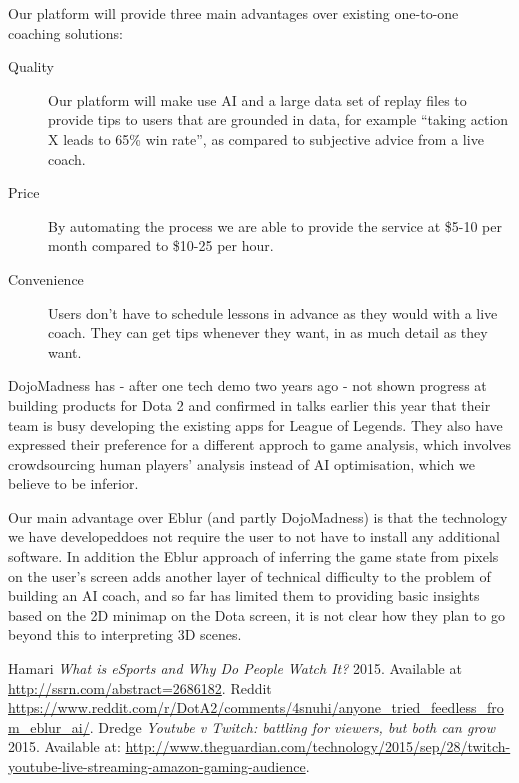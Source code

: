 \documentclass[12pt]{article} %
\begin{document}
Our platform will provide three main advantages over existing one-to-one coaching solutions: 
\begin{description}
    \item [Quality] Our platform will make use AI and a large data set of replay files to provide tips to users that are grounded in data, for example ``taking action X leads to 65\% win rate'', as compared to subjective advice from a live coach.
    \item [Price] By automating the process we are able to provide the service at \$5-10 per month compared to \$10-25 per hour.
    \item [Convenience] Users don't have to schedule lessons in advance as they would with a live coach. They can get tips whenever they want, in as much detail as they want.
\end{description}

DojoMadness has - after one tech demo two years ago - not shown progress at building products for Dota 2 and confirmed in talks earlier this year that their team is busy developing the existing apps for League of Legends. They also have expressed their preference for a different approch to game analysis, which involves crowdsourcing human players' analysis instead of AI optimisation, which we believe to be inferior.

Our main advantage over Eblur (and partly DojoMadness) is that the technology we have developeddoes not require the user to not have to install any additional software. In addition the Eblur approach of inferring the game state from pixels on the user's screen adds another layer of technical difficulty to the problem of building an AI coach, and so far has limited them to providing basic insights based on the 2D minimap on the Dota screen, it is not clear how they plan to go beyond this to interpreting 3D scenes. 

\begin{thebibliography}{10}

  Hamari  {\em What is eSports and Why Do People Watch It?} 2015. Available at \url{http://ssrn.com/abstract=2686182}.
 Reddit \url{https://www.reddit.com/r/DotA2/comments/4snuhi/anyone_tried_feedless_from_eblur_ai/}.
 Dredge  {\em Youtube v Twitch: battling for viewers, but both can grow}  2015. Available at: \url{http://www.theguardian.com/technology/2015/sep/28/twitch-youtube-live-streaming-amazon-gaming-audience}.

\end{thebibliography}
\end{document}
